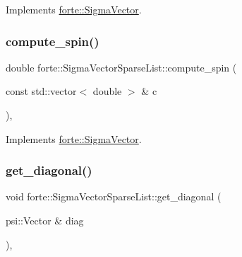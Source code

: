 Implements \mbox{\hyperlink{classforte_1_1_sigma_vector_afa184f816a37649a4e2316d62c8b621e}{forte\+::\+Sigma\+Vector}}.

\mbox{\label{classforte_1_1_sigma_vector_sparse_list_a9302fb3daf4ec14c3bca274c9757f9f3}} 
\subsubsection{\texorpdfstring{compute\+\_\+spin()}{compute\_spin()}}
{\footnotesize\ttfamily double forte\+::\+Sigma\+Vector\+Sparse\+List\+::compute\+\_\+spin (\begin{DoxyParamCaption}\item[{const std\+::vector$<$ double $>$ \&}]{c }\end{DoxyParamCaption})\hspace{0.3cm}{\ttfamily [override]}, {\ttfamily [virtual]}}



Implements \mbox{\hyperlink{classforte_1_1_sigma_vector_afe5ac487b5277b86fbe4398ba861773c}{forte\+::\+Sigma\+Vector}}.

\mbox{\label{classforte_1_1_sigma_vector_sparse_list_a63742825b87a60b9ed9a175372b34fb1}} 
\subsubsection{\texorpdfstring{get\+\_\+diagonal()}{get\_diagonal()}}
{\footnotesize\ttfamily void forte\+::\+Sigma\+Vector\+Sparse\+List\+::get\+\_\+diagonal (\begin{DoxyParamCaption}\item[{psi\+::\+Vector \&}]{diag }\end{DoxyParamCaption})\hspace{0.3cm}{\ttfamily [override]}, {\ttfamily [virtual]}}



